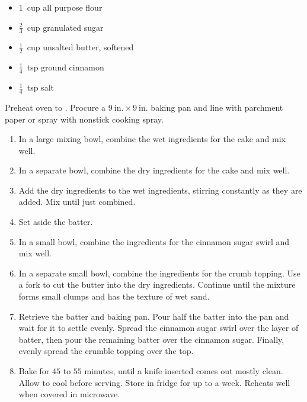\begin{minipage}{\textwidth}
\begin{multicols*}{3}
\columnbreak
\begin{minipage}{\linewidth}
\begin{itemize}
    \item $1$~cup all purpose flour
    \item $\frac{2}{3}$~cup granulated sugar
    \item $\frac{1}{2}$~cup unsalted butter, softened
    \item $\frac{1}{4}$~tsp ground cinnamon
    \item $\frac{1}{4}$~tsp salt
\end{itemize}
\end{minipage}
\end{multicols*}

\instructions
Preheat oven to . Procure a $9~\mathrm{in.}\times9~\mathrm{in.}$ baking pan and line with parchment paper or spray with nonstick cooking spray.
\begin{enumerate}
    \item In a large mixing bowl, combine the wet ingredients for the cake and mix well.
    \item In a separate bowl, combine the dry ingredients for the cake and mix well.
    \item Add the dry ingredients to the wet ingredients, stirring constantly as they are added. Mix until just combined.
    \item Set aside the batter.
    \item In a small bowl, combine the ingredients for the cinnamon sugar swirl and mix well.
    \item In a separate small bowl, combine the ingredients for the crumb topping. Use a fork to cut the butter into the dry ingredients. Continue until the mixture forms small clumps and has the texture of wet sand.
    \item Retrieve the batter and baking pan. Pour half the batter into the pan and wait for it to settle evenly. Spread the cinnamon sugar swirl over the layer of batter, then pour the remaining batter over the cinnamon sugar. Finally, evenly spread the crumble topping over the top.
    \item Bake for $45$ to $55$ minutes, until a knife inserted comes out mostly clean. Allow to cool before serving. Store in fridge for up to a week. Reheats well when covered in microwave.
\end{enumerate}

\spewfootnotes
\end{minipage}


